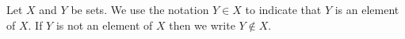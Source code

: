 \begin{df}[$\in$]
\label{def:SetInclusion}
    Let $X$ and $Y$ be sets. 
    We use the notation $Y \in X$ to indicate 
    that $Y$ is an element of $X$. 
    If $Y$ is not an element of $X$ then we write
    $Y \not \in X$. 
\end{df}
